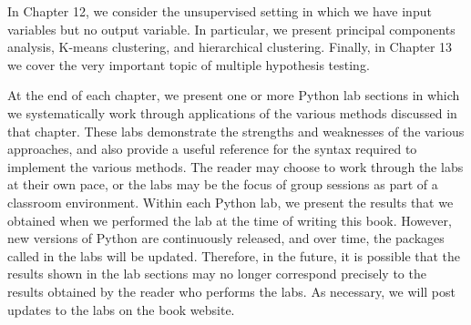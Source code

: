 In Chapter 12, we consider the unsupervised setting in which we have input variables but no output variable. In particular, we present principal components analysis, K-means clustering, and hierarchical clustering. Finally, in Chapter 13 we cover the very important topic of multiple hypothesis testing.

At the end of each chapter, we present one or more Python lab sections in which we systematically work through applications of the various methods discussed in that chapter. These labs demonstrate the strengths and weaknesses of the various approaches, and also provide a useful reference for the syntax required to implement the various methods. The reader may choose to work through the labs at their own pace, or the labs may be the focus of group sessions as part of a classroom environment. Within each Python lab, we present the results that we obtained when we performed the lab at the time of writing this book. However, new versions of Python are continuously released, and over time, the packages called in the labs will be updated. Therefore, in the future, it is possible that the results shown in the lab sections may no longer correspond precisely to the results obtained by the reader who performs the labs. As necessary, we will post updates to the labs on the book website.

